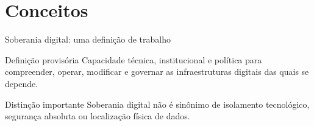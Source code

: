 \section{Conceitos}

\begin{frame}{Soberania digital: uma definição de trabalho}
  \begin{block}{Definição provisória}
    Capacidade técnica, institucional e política para compreender, operar, modificar e governar as infraestruturas digitais das quais se depende.
  \end{block}
  \begin{alertblock}{Distinção importante}
    Soberania digital não é sinônimo de isolamento tecnológico, segurança absoluta ou localização física de dados.
  \end{alertblock}
\end{frame}
